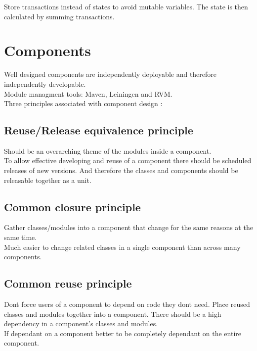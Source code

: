 \documentclass[11pt]{scrartcl} %
\begin{document}
Store transactions instead of states to avoid mutable variables. The
state is then calculated by summing transactions.

\section{Components}

Well designed components are independently deployable and therefore
independently developable.\\

Module managment tools: Maven, Leiningen and RVM.\\

Three principles associated with component design :

\subsection{Reuse/Release equivalence principle}

Should be an overarching theme of the modules inside a component.\\

To allow effective developing and reuse of a component there should be
scheduled releases of new versions. And therefore the classes and
components should be releasable together as a unit.

\subsection{Common closure principle}

Gather classes/modules into a component that change for the same
reasons at the same time.\\

Much easier to change related classes in a single component than across
many components.

\subsection{Common reuse principle}

Dont force users of a component to depend on code they dont need.
Place reused classes and modules together into a component. There
should be a high dependency in a component's classes and modules.\\

If dependant on a component better to be completely dependant on the
entire component.
\end{document}
